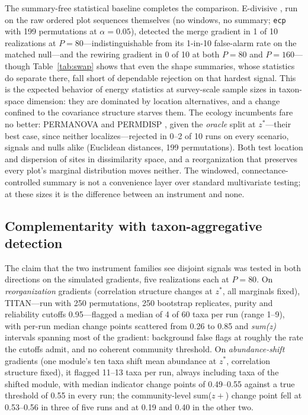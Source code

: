 \documentclass[review,12pt,authoryear]{elsarticle}
\theoremstyle{remark}
\begin{document}
The summary-free statistical baseline completes the comparison. E-divisive
\citep{matteson2014ediv}, run on the raw ordered plot sequences themselves
(no windows, no summary; \texttt{ecp} with 199 permutations at
$\alpha = 0.05$), detected the merge gradient in 1 of 10 realizations at
$P = 80$---indistinguishable from its 1-in-10 false-alarm rate on the
matched null---and the rewiring gradient in 0 of 10 at both $P = 80$ and
$P = 160$---though Table~\ref{tab:swap} shows that even the shape
summaries, whose statistics do separate there, fall short of dependable
rejection on that hardest signal. This is
the expected behavior of energy statistics at survey-scale sample sizes in
taxon-space dimension: they are dominated by location alternatives, and a
change confined to the covariance structure starves them. The ecology
incumbents fare no better: PERMANOVA and PERMDISP
\citep{anderson2001permanova}, given the \emph{oracle} split at $z^\ast$---their best case, since neither localizes---rejected in 0--2 of 10 runs on
every scenario, signals and nulls alike (Euclidean distances, 199
permutations). Both test location and dispersion of sites in dissimilarity
space, and a reorganization that preserves every plot's marginal
distribution moves neither. The windowed, connectance-controlled summary is
not a convenience layer over standard multivariate testing; at these sizes
it is the difference between an instrument and none.

\subsection{Complementarity with taxon-aggregative detection}
\label{sec:titan}

The claim that the two instrument families see disjoint signals was tested in
both directions on the simulated gradients, five realizations each at $P=80$.
On \emph{reorganization} gradients (correlation structure changes at
$z^\ast$, all marginals fixed), TITAN---run with 250 permutations, 250
bootstrap replicates, purity and reliability cutoffs 0.95---flagged a median
of 4 of 60 taxa per run (range 1--9), with per-run median change points
scattered from 0.26 to 0.85 and \textit{sum(z)} intervals spanning most of the
gradient: background false flags at roughly the rate the cutoffs admit, and no
coherent community threshold. On \emph{abundance-shift} gradients (one
module's ten taxa shift mean abundance at $z^\ast$, correlation structure
fixed), it flagged 11--13 taxa per run, always including taxa of the shifted
module, with median indicator change points of 0.49--0.55 against a true
threshold of 0.55 in every run; the community-level sum($z+$) change point
fell at 0.53--0.56 in three of five runs and at 0.19 and 0.40 in the other
two.
\end{document}
